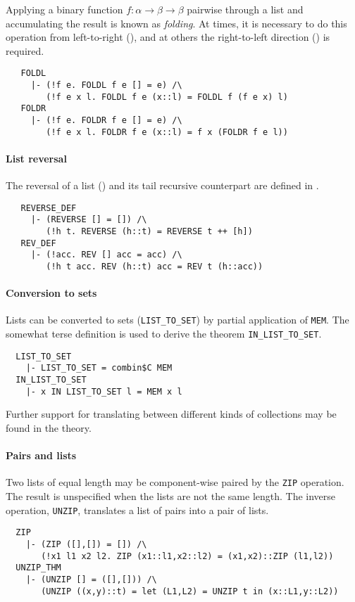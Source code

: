 Applying a binary function $f : \alpha\to\beta\to\beta$ pairwise
through a list and accumulating the result is known as
\emph{folding}. At times, it is necessary to do this operation
from left-to-right (), and at others the
right-to-left direction () is required.
%
{\small
\begin{verbatim}
   FOLDL
     |- (!f e. FOLDL f e [] = e) /\
        (!f e x l. FOLDL f e (x::l) = FOLDL f (f e x) l)
   FOLDR
     |- (!f e. FOLDR f e [] = e) /\
        (!f e x l. FOLDR f e (x::l) = f x (FOLDR f e l))
\end{verbatim}
}

\paragraph {List reversal}

The reversal of a list () and its tail recursive
counterpart  are defined in .
{\small
\begin{verbatim}
   REVERSE_DEF
     |- (REVERSE [] = []) /\
        (!h t. REVERSE (h::t) = REVERSE t ++ [h])
   REV_DEF
     |- (!acc. REV [] acc = acc) /\
        (!h t acc. REV (h::t) acc = REV t (h::acc))
\end{verbatim}
}

\paragraph {Conversion to sets}

Lists can be converted to sets ({\small\verb+LIST_TO_SET+}) by
partial application of {\small\verb+MEM+}. The somewhat
terse definition is used to derive the theorem
{\small\verb+IN_LIST_TO_SET+}.
%
{\small
\begin{verbatim}
  LIST_TO_SET
    |- LIST_TO_SET = combin$C MEM
  IN_LIST_TO_SET
    |- x IN LIST_TO_SET l = MEM x l
\end{verbatim}
}
%
Further support for translating between different kinds of
collections may be found in the  theory.

\paragraph {Pairs and lists}

Two lists of equal length may be component-wise paired by
the {\small\verb+ZIP+} operation. The result is unspecified
when the lists are not the same length. The inverse operation,
{\small\verb+UNZIP+}, translates a list of pairs into a pair of
lists.
%
{\small
\begin{verbatim}
  ZIP
    |- (ZIP ([],[]) = []) /\
       (!x1 l1 x2 l2. ZIP (x1::l1,x2::l2) = (x1,x2)::ZIP (l1,l2))
  UNZIP_THM
    |- (UNZIP [] = ([],[])) /\
       (UNZIP ((x,y)::t) = let (L1,L2) = UNZIP t in (x::L1,y::L2))
\end{verbatim}
}


